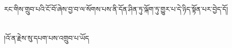 རང་གིས་གྲུབ་པའི་ངོ་བོ་ཞེས་བྱ་བ་ལ་སོགས་པས་ནི་དོན་ཤིན་ཏུ་ལྐོག་ཏུ་གྱུར་པ་དེ་ཉིད་སྟོན་པར་བྱེད་དོ།\chapter{ }།འོ་ན་རྗེས་སུ་དཔག་པས་འགྲུབ་པ་ཡོད